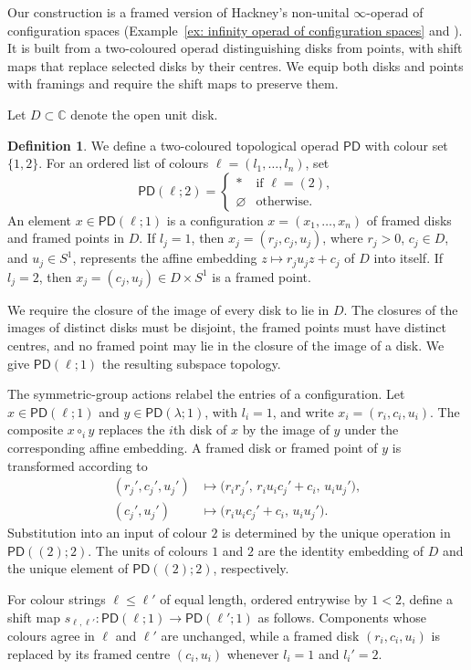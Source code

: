 \documentclass{amsart}
\theoremstyle{definition}
\newtheorem{definition}[theorem]{Definition}%
\numberwithin{equation}{section}
\begin{document}
Our construction is a framed version of Hackney's non-unital
$\infty$-operad of configuration spaces
(Example~\ref{ex: infinity operad of configuration spaces} and
\cite[Example~1]{hackney_config}). It is built from a two-coloured
operad distinguishing disks from points, with shift maps that replace
selected disks by their centres. We equip both disks and points with
framings and require the shift maps to preserve them.

Let $D\subset\mathbb C$ denote the open unit disk.

\begin{definition}
\label{def:operad-with-shifts}
We define a two-coloured topological operad $\mathsf{PD}$ with colour
set $\{1,2\}$. For an ordered list of colours
$\ell=(l_1,\ldots,l_n)$, set
\[
\mathsf{PD}(\ell;2)
=
\begin{cases}
* & \text{if $\ell=(2)$},\\
\varnothing & \text{otherwise}.
\end{cases}
\]
An element $x\in\mathsf{PD}(\ell;1)$ is a configuration
$x=(x_1,\ldots,x_n)$ of framed disks and framed points in $D$. If
$l_j=1$, then $x_j=(r_j,c_j,u_j)$, where $r_j>0$, $c_j\in D$, and
$u_j\in S^1$, represents the affine embedding
$z\mapsto r_ju_jz+c_j$ of $D$ into itself. If $l_j=2$, then
$x_j=(c_j,u_j)\in D\times S^1$ is a framed point.

We require the closure of the image of every disk to lie in $D$. The
closures of the images of distinct disks must be disjoint, the
framed points must have distinct centres, and no framed point may lie
in the closure of the image of a disk. We give
$\mathsf{PD}(\ell;1)$ the resulting subspace topology.

The symmetric-group actions relabel the entries of a configuration.
Let $x\in\mathsf{PD}(\ell;1)$ and
$y\in\mathsf{PD}(\lambda;1)$, with $l_i=1$, and write
$x_i=(r_i,c_i,u_i)$. The composite $x\circ_i y$ replaces the $i$th
disk of $x$ by the image of $y$ under the corresponding affine
embedding. A framed disk or framed point of $y$ is transformed
according to
\[
\begin{aligned}
(r_j',c_j',u_j')
&\longmapsto
\bigl(r_ir_j',\,r_iu_ic_j'+c_i,\,u_iu_j'\bigr),\\
(c_j',u_j')
&\longmapsto
\bigl(r_iu_ic_j'+c_i,\,u_iu_j'\bigr).
\end{aligned}
\]
Substitution into an input of colour $2$ is determined by the unique
operation in $\mathsf{PD}((2);2)$. The units of colours $1$ and $2$
are the identity embedding of $D$ and the unique element of
$\mathsf{PD}((2);2)$, respectively.

For colour strings $\ell\leq\ell'$ of equal length, ordered entrywise
by $1<2$, define a shift map
$s_{\ell,\ell'}\colon\mathsf{PD}(\ell;1)\to
\mathsf{PD}(\ell';1)$ as follows. Components whose colours agree in
$\ell$ and $\ell'$ are unchanged, while a framed disk
$(r_i,c_i,u_i)$ is replaced by its framed centre $(c_i,u_i)$ whenever
$l_i=1$ and $l_i'=2$.
\end{definition}
\end{document}
